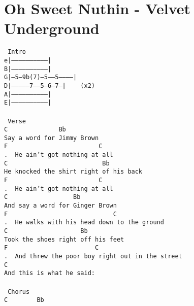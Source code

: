 \newpage
\section{Oh Sweet Nuthin - Velvet Underground}
\label{Oh Sweet Nuthin - Velvet Underground}
\texttt{\lbrack\ Intro\rbrack\\
e|------------------------------|\\
B|------------------------------|\\
G|--5--9b(7)--5-----5-----------|\\
D|---------------7-----5--6--7--|\ \ \ \ (x2)\\
A|------------------------------|\\
E|------------------------------|\\
\\
\lbrack\ Verse\rbrack\\
C\ \ \ \ \ \ \ \ \ \ \ \ \ \ Bb\\
Say\ a\ word\ for\ Jimmy\ Brown\\
F\ \ \ \ \ \ \ \ \ \ \ \ \ \ \ \ \ \ \ \ \ \ \ \ \ C\\
.\ \ He\ ain't\ got\ nothing\ at\ all\\
C\ \ \ \ \ \ \ \ \ \ \ \ \ \ \ \ \ \ \ \ \ \ \ \ \ \ Bb\\
He\ knocked\ the\ shirt\ right\ of\ his\ back\\
F\ \ \ \ \ \ \ \ \ \ \ \ \ \ \ \ \ \ \ \ \ \ \ \ \ C\\
.\ \ He\ ain't\ got\ nothing\ at\ all\\
C\ \ \ \ \ \ \ \ \ \ \ \ \ \ \ \ \ \ Bb\\
And\ say\ a\ word\ for\ Ginger\ Brown\\
F\ \ \ \ \ \ \ \ \ \ \ \ \ \ \ \ \ \ \ \ \ \ \ \ \ \ \ \ \ C\\
.\ \ He\ walks\ with\ his\ head\ down\ to\ the\ ground\\
C\ \ \ \ \ \ \ \ \ \ \ \ \ \ \ \ \ \ \ \ Bb\\
Took\ the\ shoes\ right\ off\ his\ feet\\
F\ \ \ \ \ \ \ \ \ \ \ \ \ \ \ \ \ \ \ \ \ \ \ \ C\\
.\ \ And\ threw\ the\ poor\ boy\ right\ out\ in\ the\ street\\
C\\
And\ this\ is\ what\ he\ said:\\
\\
\lbrack\ Chorus\rbrack\\
C\ \ \ \ \ \ \ \ Bb\\
}
